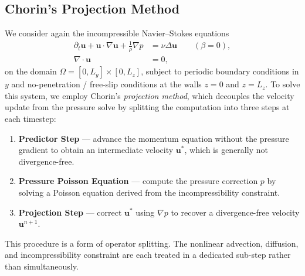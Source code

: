 \subsection{Chorin's Projection Method}
We consider again the incompressible Navier--Stokes equations
\begin{align}
    \partial_t \mathbf{u} + \mathbf{u} \cdot \nabla \mathbf{u}
    + \frac{1}{\rho}\nabla p &= \nu \Delta \mathbf{u}
    \qquad (\beta = 0), \label{eq:ns_mom} \\
    \nabla \cdot \mathbf{u} &= 0, \label{eq:ns_div}
\end{align}
on the domain $\Omega = [0, L_y] \times [0, L_z]$, subject to periodic
boundary conditions in $y$ and no-penetration / free-slip conditions at
the walls $z = 0$ and $z = L_z$.
To solve this system, we employ Chorin's \textit{projection
method}, which decouples the velocity update from the pressure solve by splitting the computation into three steps at each timestep:
\begin{enumerate}
    \item \textbf{Predictor Step} — advance the momentum equation without the
          pressure gradient to obtain an intermediate velocity
          $\mathbf{u}^*$, which is generally not divergence-free.
    \item \textbf{Pressure Poisson Equation} — compute the pressure correction $p$
          by solving a Poisson equation derived from the incompressibility
          constraint.
    \item \textbf{Projection Step} — correct $\mathbf{u}^*$ using $\nabla p$
          to recover a divergence-free velocity $\mathbf{u}^{n+1}$.
\end{enumerate}
This procedure is a form of operator splitting. The nonlinear advection,
diffusion, and incompressibility constraint are each treated in a
dedicated sub-step rather than simultaneously.

